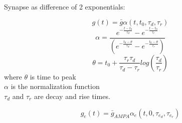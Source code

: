 \documentclass[10pt,a4paper]{article}
\begin{document}
\sffamily\sansmath
%
%
%
%
%
%

Synapse as difference of 2 exponentials:

\begin{equation}
g(t) = \bar{g}\alpha(t, t_0, \tau_d, \tau_r)
\end{equation}
\begin{equation}
\alpha = \frac{ e^{-\frac{t-t_0}{\tau_{d}}} - e^{-\frac{t-t_0}{\tau_{r}}}}{( e^{-\frac{t_0-\theta}{\tau_{d}}} - e^{-\frac{t_0-\theta}{\tau_{r}}})}
\end{equation}
\begin{equation}
\theta = t_0 + \frac{\tau_r \tau_d}{\tau_d - \tau_r} log(\frac{\tau_d}{\tau_r})
\end{equation}
where $\theta$ is  time to peak\\
$\alpha$ is the normalization function\\
$\tau_d$ and $\tau_r$ are decay and rise times.

\begin{equation}
g_{e}(t) = \bar{g}_{AMPA} \alpha_e (t, 0, \tau_{e_d}, \tau_{e_r})
\end{equation}
\end{document}
